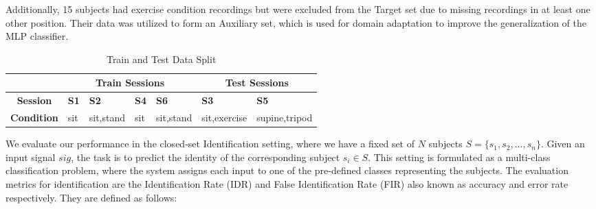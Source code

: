Additionally, 15 subjects had exercise condition recordings but were excluded from the Target set due to missing recordings in at least one other position.
Their data was utilized to form an Auxiliary set, which is used for domain adaptation to improve the generalization of the MLP classifier.

\begin{table}[!t]
    \centering
    \caption{Train and Test Data Split}
    \label{tab:session_conditions}
    \begin{tabular}{|c|p{0.6cm}|p{0.7cm}|p{0.6cm}|p{0.7cm}|p{1.05cm}|p{1.05cm}|}
    \cline{2-7}
    \multicolumn{1}{c}{} & \multicolumn{4}{|c|}{\textbf{Train Sessions}} %
    & \multicolumn{2}{|c|}{\textbf{Test Sessions}} \\ %
    \hline
    \textbf{Session} & \textbf{S1} & \textbf{S2} & \textbf{S4} & \textbf{S6} & \textbf{S3} & \textbf{S5} \\ 
    \hline
    \textbf{Condition} & sit & sit,\newline stand &  sit & sit,\newline stand & sit,\newline exercise & supine,\newline tripod  \\ 
    \hline
    \end{tabular}
    \vspace{0.5em}
\end{table}

We evaluate our performance in the closed-set Identification setting, where we have a fixed set of $N$ subjects $S=\{s_1,s_2,...,s_n\}$.
Given an input signal $sig$, the task is to predict the identity of the corresponding subject $s_{i}\in S$.
This setting is formulated as a multi-class classification problem, where the system assigns each input to one of the pre-defined classes representing the subjects.
The evaluation metrics for identification are the Identification Rate (IDR) and False Identification Rate (FIR) also known as accuracy and error rate respectively. They are defined as follows:

